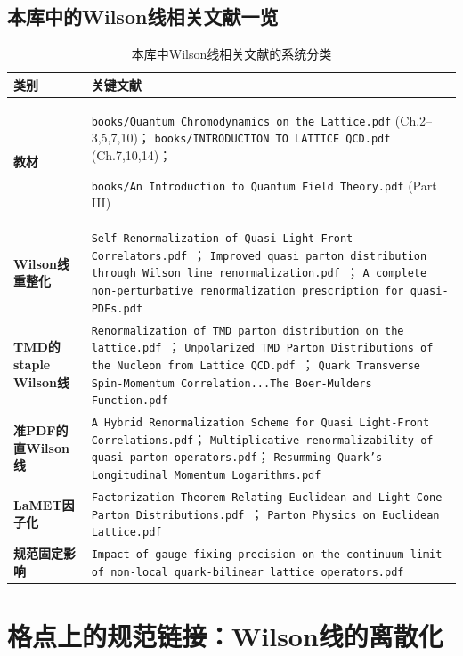 \documentclass[12pt,a4paper]{ctexart}
\theoremstyle{definition}
\begin{document}
\subsection{本库中的Wilson线相关文献一览}

\begin{table}[H]
\centering
\caption{本库中Wilson线相关文献的系统分类}
\label{tab:WL_papers}
\small
\begin{tabular}{lp{7cm}}
\toprule
类别 & 关键文献 \\
\midrule
\textbf{教材} &
\texttt{books/Quantum Chromodynamics on the Lattice.pdf} (Ch.2--3,5,7,10)；
\texttt{books/INTRODUCTION TO LATTICE QCD.pdf} (Ch.7,10,14)；

\texttt{books/An Introduction to Quantum Field Theory.pdf} (Part III) \\
\textbf{Wilson线重整化} &
\texttt{Self-Renormalization of Quasi-Light-Front Correlators.pdf}~\cite{Huo2021self}；
\texttt{Improved quasi parton distribution through Wilson line renormalization.pdf}~\cite{Chen2018WLrenorm}；
\texttt{A complete non-perturbative renormalization prescription for quasi-PDFs.pdf} \\
\textbf{TMD的staple Wilson线} &
\texttt{Renormalization of TMD parton distribution on the lattice.pdf}~\cite{Zhang2022renormTMD}；
\texttt{Unpolarized TMD Parton Distributions of the Nucleon from Lattice QCD.pdf}~\cite{He2024unpolTMD}；
\texttt{Quark Transverse Spin-Momentum Correlation...The Boer-Mulders Function.pdf}~\cite{Ma2025BoerMulders} \\
\textbf{准PDF的直Wilson线} &
\texttt{A Hybrid Renormalization Scheme for Quasi Light-Front Correlations.pdf}；
\texttt{Multiplicative renormalizability of quasi-parton operators.pdf}；
\texttt{Resumming Quark's Longitudinal Momentum Logarithms.pdf} \\
\textbf{LaMET因子化} &
\texttt{Factorization Theorem Relating Euclidean and Light-Cone Parton Distributions.pdf}~\cite{Izubuchi2018}；
\texttt{Parton Physics on Euclidean Lattice.pdf}~\cite{Ji2013Euclidean} \\
\textbf{规范固定影响} &
\texttt{Impact of gauge fixing precision on the continuum limit of non-local quark-bilinear lattice operators.pdf}~\cite{Zhang2024gauge_fixing} \\
\bottomrule
\end{tabular}
\end{table}

\section{格点上的规范链接：Wilson线的离散化}
\end{document}

